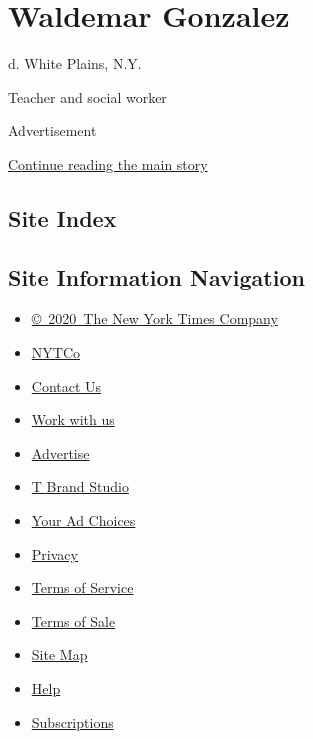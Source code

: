 \hypertarget{waldemar-gonzalez}{%
\section{Waldemar Gonzalez}\label{waldemar-gonzalez}}

d. White Plains, N.Y.

Teacher and social worker

Advertisement

\protect\hyperlink{after-bottom}{Continue reading the main story}

\hypertarget{site-index}{%
\subsection{Site Index}\label{site-index}}

\hypertarget{site-information-navigation}{%
\subsection{Site Information
Navigation}\label{site-information-navigation}}

\begin{itemize}
\tightlist
\item
  \href{https://help.nytimes.com/hc/en-us/articles/115014792127-Copyright-notice}{©~2020~The
  New York Times Company}
\end{itemize}

\begin{itemize}
\tightlist
\item
  \href{https://www.nytco.com/}{NYTCo}
\item
  \href{https://help.nytimes.com/hc/en-us/articles/115015385887-Contact-Us}{Contact
  Us}
\item
  \href{https://www.nytco.com/careers/}{Work with us}
\item
  \href{https://nytmediakit.com/}{Advertise}
\item
  \href{http://www.tbrandstudio.com/}{T Brand Studio}
\item
  \href{https://www.nytimes.com/privacy/cookie-policy\#how-do-i-manage-trackers}{Your
  Ad Choices}
\item
  \href{https://www.nytimes.com/privacy}{Privacy}
\item
  \href{https://help.nytimes.com/hc/en-us/articles/115014893428-Terms-of-service}{Terms
  of Service}
\item
  \href{https://help.nytimes.com/hc/en-us/articles/115014893968-Terms-of-sale}{Terms
  of Sale}
\item
  \href{https://spiderbites.nytimes.com}{Site Map}
\item
  \href{https://help.nytimes.com/hc/en-us}{Help}
\item
  \href{https://www.nytimes.com/subscription?campaignId=37WXW}{Subscriptions}
\end{itemize}
